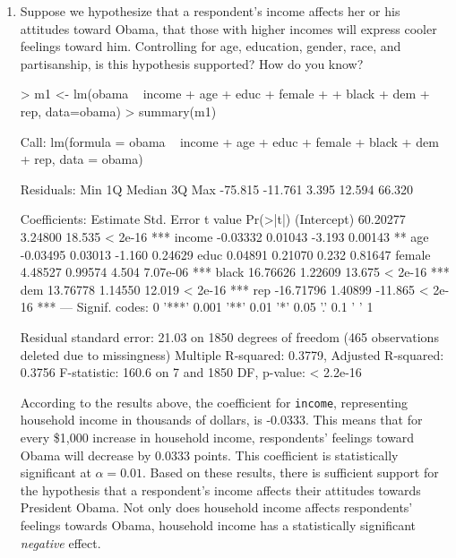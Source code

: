 \documentclass[12pt]{article}
\begin{document}
\begin{enumerate}
\item Suppose we hypothesize that a respondent's income affects her or his attitudes toward Obama, that those with higher incomes will express cooler feelings toward him.  Controlling for age, education, gender, race, and partisanship, is this hypothesis supported?  How do you know?

\begin{Schunk}
\begin{Sinput}
> m1 <- lm(obama ~ income + age + educ + female 
+          + black + dem + rep, data=obama)
> summary(m1)
\end{Sinput}
\begin{Soutput}
Call:
lm(formula = obama ~ income + age + educ + female + black + dem + 
    rep, data = obama)

Residuals:
    Min      1Q  Median      3Q     Max 
-75.815 -11.761   3.395  12.594  66.320 

Coefficients:
             Estimate Std. Error t value Pr(>|t|)    
(Intercept)  60.20277    3.24800  18.535  < 2e-16 ***
income       -0.03332    0.01043  -3.193  0.00143 ** 
age          -0.03495    0.03013  -1.160  0.24629    
educ          0.04891    0.21070   0.232  0.81647    
female        4.48527    0.99574   4.504 7.07e-06 ***
black        16.76626    1.22609  13.675  < 2e-16 ***
dem          13.76778    1.14550  12.019  < 2e-16 ***
rep         -16.71796    1.40899 -11.865  < 2e-16 ***
---
Signif. codes:  0 '***' 0.001 '**' 0.01 '*' 0.05 '.' 0.1 ' ' 1

Residual standard error: 21.03 on 1850 degrees of freedom
  (465 observations deleted due to missingness)
Multiple R-squared:  0.3779,	Adjusted R-squared:  0.3756 
F-statistic: 160.6 on 7 and 1850 DF,  p-value: < 2.2e-16
\end{Soutput}
\end{Schunk}

According to the results above, the coefficient for \texttt{income}, representing household income in thousands of dollars, is -0.0333. This means that for every \$1,000 increase in household income, respondents' feelings toward Obama will decrease by 0.0333 points. This coefficient is statistically significant at $\alpha=0.01$. Based on these results, there is sufficient support for the hypothesis that a respondent's income affects their attitudes towards President Obama. Not only does household income affects respondents' feelings towards Obama, household income has a statistically significant \emph{negative} effect.


\end{enumerate}
\end{document}
